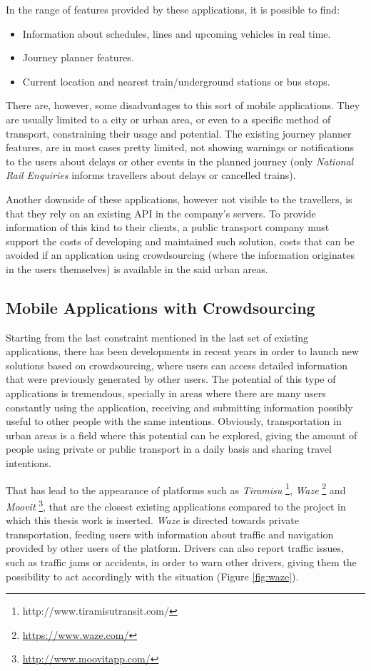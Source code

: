 In the range of features provided by these applications, it is possible to find: 

\begin{itemize}
\item Information about schedules, lines and upcoming vehicles in real time.
\item Journey planner features.
\item Current location and nearest train/underground stations or bus stops.
\end{itemize}

There are, however, some disadvantages to this sort of mobile applications. They are usually limited to a city or urban area, or even to a specific method of transport, constraining their usage and potential.
The existing journey planner features, are in most cases pretty limited, not showing warnings or notifications to the users about delays or other events in the planned journey (only \emph{National Rail Enquiries} informs travellers about delays or cancelled trains).

Another downside of these applications, however not visible to the travellers, is that they rely on an existing API in the company's servers. To provide information of this kind to their clients, a public transport company must support the costs of developing and maintained such solution, costs that can be avoided if an application using crowdsourcing (where the information originates in the users themselves) is available in the said urban areas.

\subsection{Mobile Applications with Crowdsourcing}

Starting from the last constraint mentioned in the last set of existing applications, there has been developments in recent years in order to launch new solutions based on crowdsourcing, where users can access detailed information that were previously generated by other users. The potential of this type of applications is tremendous, specially in areas where there are many users  constantly using the application, receiving and submitting information possibly useful to other people with the same intentions. 
Obviously, transportation in urban areas is a field where this potential can be explored, giving the amount of people using private or public transport in a daily basis and sharing travel intentions.

That has lead to the appearance of platforms such as \emph{Tiramisu} \footnote{http://www.tiramisutransit.com/}, \emph{Waze} \footnote{\url{https://www.waze.com/}} and \emph{Moovit} \footnote{\url{http://www.moovitapp.com/}},  that are the closest existing applications compared to the project in which this thesis work is inserted.
\emph{Waze} is directed towards private transportation, feeding users with information about traffic and navigation provided by other users of the platform. Drivers can also report traffic issues, such as traffic jams or accidents, in order to warn other drivers, giving them the possibility to act accordingly with the situation (Figure \ref{fig:waze}).

